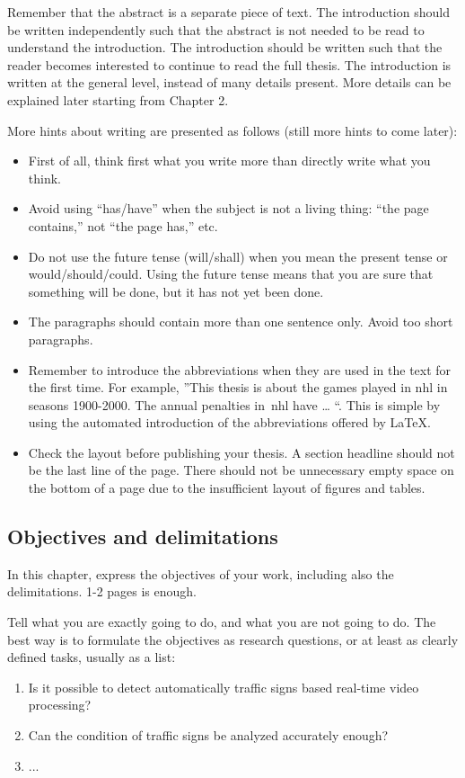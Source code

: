 \documentclass{lutmscthesis}[2017/10/03]
\begin{document}
Remember that the abstract is a separate piece of text. 
The introduction should be written independently such that the abstract is not needed to be read to understand the introduction. 
The introduction should be written such that the reader becomes interested to continue to read the full thesis. 
The introduction is written at the general level, instead of many details present. 
More details can be explained later starting from Chapter 2. 

More hints about writing are presented as follows (still more hints to come later): 
\vspace{-18pt}
\begin{itemize}
\itemsep=-3pt
\item First of all, think first what you write more than directly write what you think. 
\item Avoid using “has/have” when the subject is not a living thing: “the page contains,” not “the page has,” etc. 
\item Do not use the future tense (will/shall) when you mean the present tense or would/should/could. Using the future tense means that you are sure that something will be done, but it has not yet been done. 
\item The paragraphs should contain more than one sentence only. Avoid too short paragraphs. 
\item Remember to introduce the abbreviations when they are used in the text for the first time. For example, ”This thesis is about the games played in \gls{nhl} in seasons 1900-2000. The annual penalties in~\gls{nhl} have … “. 
This is simple by using the automated introduction of the abbreviations offered by LaTeX. 
\item Check the layout before publishing your thesis. A section headline should not be the last line of the page. There should not be unnecessary empty space on the bottom of a page due to the insufficient layout of figures and tables.
\end{itemize}


\subsection{Objectives and delimitations}
\label{sec:objectives}

In this chapter, express the objectives of your work, including also the delimitations. 1-2 pages is enough. 

Tell what you are exactly going to do, and what you are not going to do. The best way is to formulate the objectives as research questions, or at least as clearly defined tasks, usually as a list: 
\begin{enumerate}
\item Is it possible to detect automatically traffic signs based real-time video processing? 
\item Can the condition of traffic signs be analyzed accurately enough? 
\item ...
\end{enumerate}
\end{document}
